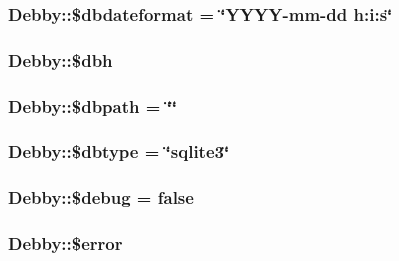 \subsubsection[{\$dbdateformat}]{\setlength{\rightskip}{0pt plus 5cm}Debby\+::\$dbdateformat = \char`\"{}Y\+Y\+Y\+Y-\/mm-\/{\bf dd} h\+:i\+:s\char`\"{}}\label{classDebby_a2f7e21b7f33e7ad7ea66a5f55ad7876a}
\hypertarget{classDebby_aa4930493a32523bb82bf4491e6e48f01}{}
\subsubsection[{\$dbh}]{\setlength{\rightskip}{0pt plus 5cm}Debby\+::\$dbh}\label{classDebby_aa4930493a32523bb82bf4491e6e48f01}
\hypertarget{classDebby_a95c130458f29f6c7c240cdc93a071085}{}
\subsubsection[{\$dbpath}]{\setlength{\rightskip}{0pt plus 5cm}Debby\+::\$dbpath = \char`\"{}\char`\"{}}\label{classDebby_a95c130458f29f6c7c240cdc93a071085}
\hypertarget{classDebby_a4697ceb97e707ab80ae2a215f932b58d}{}
\subsubsection[{\$dbtype}]{\setlength{\rightskip}{0pt plus 5cm}Debby\+::\$dbtype = \char`\"{}sqlite3\char`\"{}}\label{classDebby_a4697ceb97e707ab80ae2a215f932b58d}
\hypertarget{classDebby_a7ff78fa74f4b5822202b30a254600012}{}
\subsubsection[{\$debug}]{\setlength{\rightskip}{0pt plus 5cm}Debby\+::\$debug = false}\label{classDebby_a7ff78fa74f4b5822202b30a254600012}
\hypertarget{classDebby_a0ac5d819d971fa898a2e88dc5991b008}{}
\subsubsection[{\$error}]{\setlength{\rightskip}{0pt plus 5cm}Debby\+::\$error}\label{classDebby_a0ac5d819d971fa898a2e88dc5991b008}
\hypertarget{classDebby_a7d54dc610647753b09fd501ee0b65f54}{}
